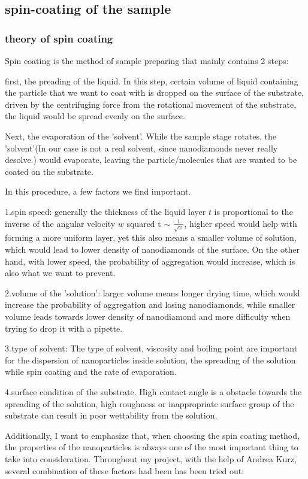 \subsection{spin-coating of the sample}
\subsubsection{theory of spin coating} 
Spin coating is the method of sample preparing that mainly contains 2 steps:

first, the preading of the liquid. In this step, certain volume of liquid containing the particle that we want to coat with is dropped on the surface of the substrate, driven by the centrifuging force from the rotational movement of the substrate, the liquid would be spread evenly on the surface.

Next, the evaporation of the 'solvent'. While the sample stage rotates, the 'solvent'(In our case is not a real solvent, since nanodiamonds never really desolve.) would evaporate, leaving the particle/molecules that are wanted to be coated on the substrate.

In this procedure, a few factors we find important.

1.spin speed: generally the thickness of the liquid layer $t$ is proportional to the inverse of the angular velocity $w$ squared t $\sim$ $\frac{1}{\sqrt{\omega}}$, higher speed would help with forming a more uniform layer, yet this also means a smaller volume of solution, which would lead to lower density of nanodiamonds of the surface. On the other hand, with lower speed, the probability of aggregation would increase, which is also what we want to prevent.

2.volume of the 'solution': larger volume means longer drying time, which would increase the probability of aggregation and losing nanodiamonds, while smaller volume leads towards lower density of nanodiamond and more difficulty when trying to drop it with a pipette. 

3.type of solvent: The type of solvent, viscosity and boiling point are important for the dispersion of nanoparticles inside solution, the spreading of the solution while spin coating and the rate of evaporation.

4.surface condition of the substrate. High contact angle is a obstacle towards the spreading of the solution, high roughness or inappropriate surface group of the substrate can result in poor wettability from the solution.

Additionally, I want to emphasize that, when choosing the spin coating method, the properties of the nanoparticles is always one of the most important thing to take into consideration. 
Throughout my project, with the help of Andrea Kurz, several combination of these factors had been has been tried out:

